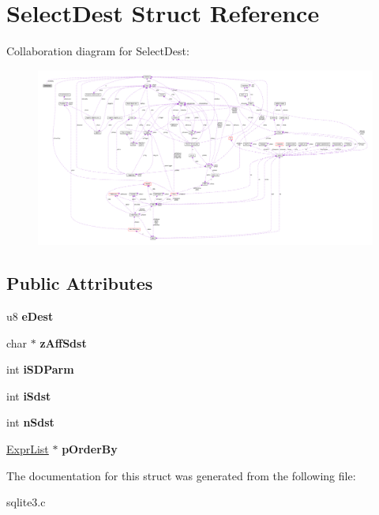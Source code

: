 \hypertarget{structSelectDest}{}\section{Select\+Dest Struct Reference}
\label{structSelectDest}


Collaboration diagram for Select\+Dest\+:\nopagebreak
\begin{figure}[H]
\begin{center}
\leavevmode
\includegraphics[width=350pt]{structSelectDest__coll__graph}
\end{center}
\end{figure}
\subsection*{Public Attributes}
\begin{DoxyCompactItemize}
\item 
u8 {\bfseries e\+Dest}\hypertarget{structSelectDest_a779c1809acadd15898db0b20e31cc23f}{}\label{structSelectDest_a779c1809acadd15898db0b20e31cc23f}

\item 
char $\ast$ {\bfseries z\+Aff\+Sdst}\hypertarget{structSelectDest_ada0376591a63aacaf9f39f9b45bb7178}{}\label{structSelectDest_ada0376591a63aacaf9f39f9b45bb7178}

\item 
int {\bfseries i\+S\+D\+Parm}\hypertarget{structSelectDest_ad30d63b2b7216a533a5ea476412664aa}{}\label{structSelectDest_ad30d63b2b7216a533a5ea476412664aa}

\item 
int {\bfseries i\+Sdst}\hypertarget{structSelectDest_adbc1c5f38b8c95da1d05e8c25dee400f}{}\label{structSelectDest_adbc1c5f38b8c95da1d05e8c25dee400f}

\item 
int {\bfseries n\+Sdst}\hypertarget{structSelectDest_aa4e7438446ef26231f7426edfda13e19}{}\label{structSelectDest_aa4e7438446ef26231f7426edfda13e19}

\item 
\hyperlink{structExprList}{Expr\+List} $\ast$ {\bfseries p\+Order\+By}\hypertarget{structSelectDest_a10881e4ffff470814a592d6d7e1541fa}{}\label{structSelectDest_a10881e4ffff470814a592d6d7e1541fa}

\end{DoxyCompactItemize}


The documentation for this struct was generated from the following file\+:\begin{DoxyCompactItemize}
\item 
sqlite3.\+c\end{DoxyCompactItemize}
